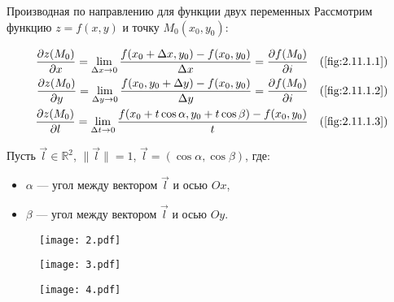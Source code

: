 \begin{tbox}{Производная по направлению для функции двух переменных}
	Рассмотрим функцию \(z = f(x, y)\) и точку \(M_0(x_0, y_0)\):

	\begin{align*}
		\frac{\partial z(M_0)}{\partial x}  = \lim_{\Delta x \to 0} \frac{f(x_0 + \Delta x, y_0) - f(x_0, y_0)}{\Delta x} = \frac{\partial f(M_0)}{\partial i} \quad& \text{(\Cref{fig:2.11.1.1})}\\
		\frac{\partial z(M_0)}{\partial y}  = \lim_{\Delta y \to 0} \frac{f(x_0, y_0 + \Delta y) - f(x_0, y_0)}{\Delta y} = \frac{\partial f(M_0)}{\partial i} \quad& \text{(\Cref{fig:2.11.1.2})}\\
		\frac{\partial z(M_0)}{\partial l} = \lim_{\Delta t \to 0} \frac{f(x_0 + t \cos \alpha, y_0 + t \cos \beta) - f(x_0, y_0)}{t} \quad&\text{(\Cref{fig:2.11.1.3})}
	\end{align*}

	Пусть \(\vec{l} \in \mathbb{R}^2\), \(\|\vec{l}\| = 1\), \(\vec{l} = (\cos \alpha, \cos \beta)\), где:
	\begin{itemize}
		\item \(\alpha\) — угол между вектором \(\vec{l}\) и осью \(Ox\),
		\item \(\beta\) — угол между вектором \(\vec{l}\) и осью \(Oy\).
	\end{itemize}
	\begin{figure}[H]
		\centering
		\begin{minipage}{0.32\linewidth}
			\centering
			\texttt{[image: 2.pdf]}
			\subcaption{ }
			\label{fig:2.11.1.1}
		\end{minipage}
		\begin{minipage}{0.32\linewidth}
			\centering
			\texttt{[image: 3.pdf]}
			\subcaption{ }
			\label{fig:2.11.1.2}
		\end{minipage}
		\begin{minipage}{0.32\linewidth}
			\centering
			\texttt{[image: 4.pdf]}
			\subcaption{ }
			\label{fig:2.11.1.3}
		\end{minipage}
		\caption{ }
		\label{fig:2.11.1}
	\end{figure}
\end{tbox}

